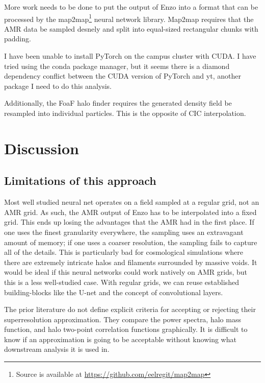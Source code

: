 More work needs to be done to put the output of Enzo into a format that can be processed by the map2map\footnote{Source is available at \url{https://github.com/eelregit/map2map}} neural network library. Map2map requires that the AMR data be sampled desnely and split into equal-sized rectangular chunks with padding. 

I have been unable to install PyTorch on the campus cluster with CUDA. I have tried using the conda package manager, but it seems there is a diamond dependency conflict between the CUDA version of PyTorch and yt, another package I need to do this analysis.

Additionally, the FoaF halo finder requires the generated density field be resampled into individual particles. This is the opposite of CIC interpolation.


\section*{Discussion}

\subsection*{Limitations of this approach}

Most well studied neural net operates on a field sampled at a regular grid, not an AMR grid. As such, the AMR output of Enzo has to be interpolated into a fixed grid. This ends up losing the advantages that the AMR had in the first place. If one uses the finest granularity everywhere, the sampling uses an extravagant amount of memory; if one uses a coarser resolution, the sampling fails to capture all of the details. This is particularly bad for cosmological simulations where there are extremely intricate halos and filaments surrounded by massive voids. It would be ideal if this neural networks could work natively on AMR grids, but this is a less well-studied case. With regular grids, we can reuse established building-blocks like the U-net and the concept of convolutional layers.

The prior literature \cite{schaurecker_super-resolving_2021,li_ai-assisted_2021} do not define explicit criteria for accepting or rejecting their superresolution approximation. They compare the power spectra, halo mass function, and halo two-point correlation functions graphically. It is difficult to know if an approximation is going to be acceptable without knowing what downstream analysis it is used in.

